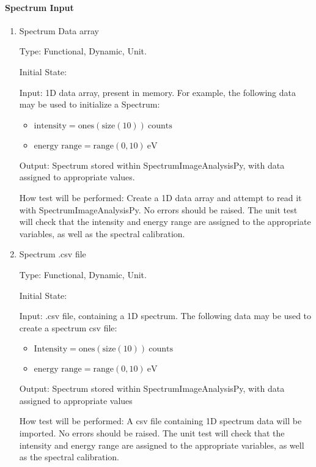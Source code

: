 \documentclass[12pt, titlepage]{article}
\newcommand{\progname}{SpectrumImageAnalysisPy}
\begin{document}
\paragraph{Spectrum Input}

\begin{enumerate}

\item{Spectrum Data array}

Type: Functional, Dynamic, Unit.
					
Initial State: 
					
Input: 1D data array, present in memory. For example, the following data may be used to initialize a Spectrum:
\begin{itemize}
	\item $\text{intensity} = \text{ones}(\text{size}(10))\ \text{counts}$
	\item $\text{energy range} = \text{range}(0, 10)\ \si{\electronvolt}$
\end{itemize}

Output: Spectrum stored within \progname{}, with data assigned to appropriate values.
					
How test will be performed: Create a 1D data array and attempt to read it with \progname{}. No errors should be raised. The unit test will check that the intensity and energy range are assigned to the appropriate variables, as well as the spectral calibration.


\item{Spectrum .csv file}

Type: Functional, Dynamic, Unit.

Initial State: 

Input: .csv file, containing a 1D spectrum. The following data may be used to create a spectrum csv file:
\begin{itemize}
	\item $\text{Intensity} = \text{ones}(\text{size}(10))\ \text{counts}$
	\item $\text{energy range} = \text{range}(0, 10)\ \si{\electronvolt}$
\end{itemize}

Output: Spectrum stored within \progname{}, with data assigned to appropriate values

How test will be performed: A csv file containing 1D spectrum data will be imported. No errors should be raised. The unit test will check that the intensity and energy range are assigned to the appropriate variables, as well as the spectral calibration.



\end{enumerate}
\end{document}
